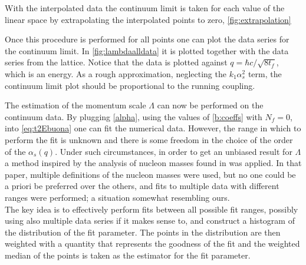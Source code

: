 
With the interpolated data the continuum limit is taken for each value of the linear space by extrapolating the interpolated points to zero, \cref{fig:extrapolation}

Once this procedure is performed for all points one can plot the data series for the continuum limit. In \cref{fig:lambdaalldata} it is plotted together with the data series from the lattice. Notice that the data is plotted against $q=\hbar c / \sqrt{8t_f}$, which is an energy. As a rough approximation, neglecting the $k_1\alpha_s^2$ term, the continuum limit plot should be proportional to the running coupling.


The estimation of the momentum scale $\Lambda$ can now be performed on the continuum data. By plugging \cref{alpha}, using the values of \cref{b:coeffs} with $N_f = 0$, into \cref{eq:t2Ebuona} one can fit the numerical data. However, the range in which to perform the fit is unknown and there is some freedom in the choice of the order of the $\alpha_s(q)$. Under such circumstances, in order to get an unbiased result for  $\Lambda$ a method inspired by the analysis of nucleon masses found in \cite{durr_ab-initio_2008-1}  was applied. In that paper, multiple definitions of the nucleon masses were used, but no one could be a priori be preferred over the others, and fits to multiple data with different ranges were performed; a situation somewhat resembling ours.\\
The key idea is to effectively perform fits between all possible fit ranges, possibly using also multiple data series if it makes sense to, and construct a histogram of the distribution of the fit parameter. The points in the distribution are then weighted with a quantity that represents the goodness of the fit and the weighted median of the points is taken as the estimator for the fit parameter.

